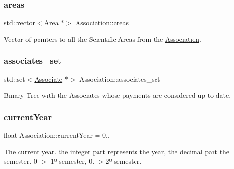 \subsubsection{\texorpdfstring{areas}{areas}}
{\footnotesize\ttfamily std\+::vector$<$\mbox{\hyperlink{classArea}{Area}} $\ast$$>$ Association\+::areas\hspace{0.3cm}{\ttfamily [private]}}



Vector of pointers to all the Scientific Areas from the \mbox{\hyperlink{classAssociation}{Association}}. 

\mbox{\label{classAssociation_a3dad047d1eed00d6bc0bb371b30e3bd0}} 
\subsubsection{\texorpdfstring{associates\+\_\+set}{associates\_set}}
{\footnotesize\ttfamily std\+::set$<$\mbox{\hyperlink{classAssociate}{Associate}} $\ast$$>$ Association\+::associates\+\_\+set\hspace{0.3cm}{\ttfamily [private]}}



Binary Tree with the Associates whose payments are considered up to date. 

\mbox{\label{classAssociation_a38c0785b12a067ee6c295a2d3ee453da}} 
\subsubsection{\texorpdfstring{current\+Year}{currentYear}}
{\footnotesize\ttfamily float Association\+::current\+Year = 0.\hspace{0.3cm}{\ttfamily [static]}, {\ttfamily [private]}}



The current year. the integer part represents the year, the decimal part the semester. 0-\/$>$ 1º semester, 0.-\/$>$2º semester. 

\mbox{\label{classAssociation_aaf2b66c89b34895285a108658336df51}} 
